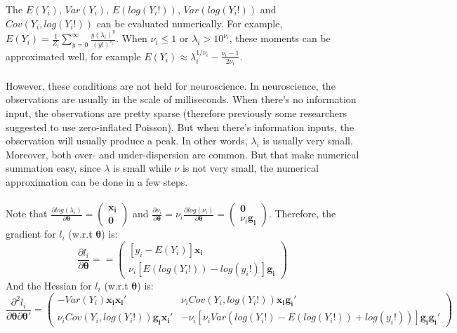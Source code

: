 \documentclass[]{article}
\begin{document}
The $E(Y_i)$, $Var(Y_i)$, $E(log(Y_i!))$, $Var(log(Y_i!))$ and $Cov(Y_i, log(Y_i!))$ can be evaluated numerically. For example, $E(Y_i) = \frac{1}{Z_i}\sum_{y=0}^{\infty}\frac{y(\lambda_i)^y}{(y!)^{\nu_i}}$. When $\nu_i \leq 1$ or $\lambda_i > 10^{\nu_i}$, these moments can be approximated well, for example $E(Y_i) \approx \lambda_i^{1/\nu_i} - \frac{\nu_i - 1}{2\nu_i}$.\\
\\
However, these conditions are not held for neuroscience. In neuroscience, the observations are usually in the scale of milliseconds. When there's no information input, the observations are pretty sparse (therefore previously some researchers suggested to use zero-inflated Poisson). But when there's information inputs, the observation will usually produce a peak. In other words, $\lambda_i$ is usually very small. Moreover, both over- and under-dispersion are common. But that make numerical summation easy, since $\lambda$ is small while $\nu$ is not very small, the numerical approximation can be done in a few steps.\\ 
\\
Note that $\frac{\partial log(\lambda_i)}{\partial\boldsymbol{\theta}} = \begin{pmatrix}
	\boldsymbol{x_i}\\ \boldsymbol{0}
\end{pmatrix}$ and $\frac{\partial \nu_i}{\partial\boldsymbol{\theta}} = \nu_i\frac{\partial log(\nu_i)}{\partial\boldsymbol{\theta}} = \begin{pmatrix} \boldsymbol{0}\\ \nu_i\boldsymbol{g_i} \end{pmatrix}$. Therefore, the gradient for $l_i$ (w.r.t $\boldsymbol{\theta}$) is:
\begin{equation*}
	\frac{\partial l_i}{\partial \boldsymbol{\theta}} = 
	 = \begin{pmatrix} [y_i - E(Y_i)]\boldsymbol{x_i}\\
		\nu_i[E(log(Y_i!)) - log(y_i!)]\boldsymbol{g_i}
	\end{pmatrix}
\end{equation*}
And the Hessian for $l_i$ (w.r.t $\boldsymbol{\theta}$) is:
\begin{equation*}
	\frac{\partial^2 l_i}{\partial \boldsymbol{\theta}\partial \boldsymbol{\theta}'} = 
	\begin{pmatrix} -Var(Y_i)\boldsymbol{x_i}\boldsymbol{x_i}' &
		 \nu_i Cov(Y_i, log(Y_i!))\boldsymbol{x_i}\boldsymbol{g_i}'\\
		\nu_i Cov(Y_i, log(Y_i!))\boldsymbol{g_i}\boldsymbol{x_i}' &
		 -\nu_i[\nu_i Var(log(Y_i!) - E(log(Y_i!)) + log(y_i!))]\boldsymbol{g_i}\boldsymbol{g_i}'
	\end{pmatrix}
\end{equation*}
\end{document}
